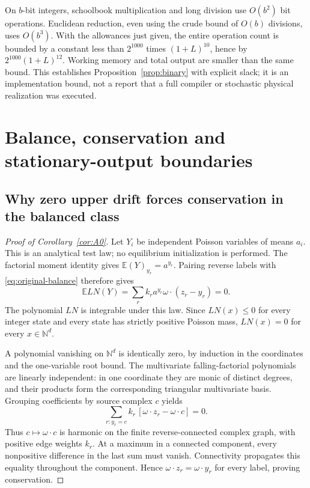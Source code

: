\documentclass[11pt,reqno]{amsart}
\theoremstyle{definition}
\theoremstyle{remark}
\newcommand{\N}{\mathbb N}
\newcommand{\E}{\mathbb E}
\begin{document}
On $b$-bit integers, schoolbook multiplication and long division use
$O(b^2)$ bit operations. Euclidean reduction, even using the crude bound of
$O(b)$ divisions, uses $O(b^3)$. With the allowances just given, the entire
operation count is bounded by a constant less than $2^{1000}$ times
$(1+L)^{10}$, hence by $2^{1000}(1+L)^{12}$. Working memory and total output
are smaller than the same bound. This establishes Proposition~\ref{prop:binary}
with explicit slack; it is an implementation bound, not a report that a full
compiler or stochastic physical realization was executed.

\section{Balance, conservation and stationary-output boundaries}\label{app:balanced-boundaries}
\subsection{Why zero upper drift forces conservation in the balanced class}\label{app:A0}
\begin{proof}[Proof of Corollary~\ref{cor:A0}]
Let $Y_i$ be independent Poisson variables of means $a_i$. This is an
analytical test law; no equilibrium initialization is performed. The factorial
moment identity gives $\E(Y)_{y_r}=a^{y_r}$. Pairing reverse labels with
\eqref{eq:original-balance} therefore gives
\[
 \E LN(Y)=\sum_r k_ra^{y_r}\omega\cdot(z_r-y_r)=0.
\]
The polynomial $LN$ is integrable under this law. Since $LN(x)\le0$ for every
integer state and every state has strictly positive Poisson mass,
$LN(x)=0$ for every $x\in\N^d$.

A polynomial vanishing on $\N^d$ is identically zero, by induction in the
coordinates and the one-variable root bound. The multivariate
falling-factorial polynomials are linearly independent:
in one coordinate they are monic of distinct degrees, and their products
form the corresponding triangular multivariate basis. Grouping coefficients
by source complex $c$ yields
\[
 \sum_{r:y_r=c}k_r\,[\omega\cdot z_r-\omega\cdot c]=0.
\]
Thus $c\mapsto\omega\cdot c$ is harmonic on the finite reverse-connected
complex graph, with positive edge weights $k_r$. At a maximum in a connected
component, every nonpositive difference in the last sum must vanish.
Connectivity propagates this equality throughout the component. Hence
$\omega\cdot z_r=\omega\cdot y_r$ for every label, proving conservation.
\end{proof}
\end{document}
